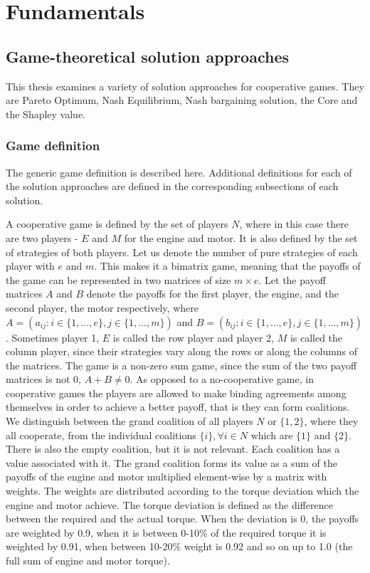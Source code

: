\chapter{Fundamentals}
\label{chp:basics}

\section{Game-theoretical solution approaches}
This thesis examines a variety of solution approaches for cooperative games. They are Pareto Optimum, Nash Equilibrium, Nash bargaining solution, the Core and the Shapley value.

\subsection{Game definition}
The generic game definition is described here. Additional definitions for each of the solution approaches are defined in the corresponding subsections of each solution.

A cooperative game is defined by the set of players $N$, where in this case there are two players - $E$ and $M$ for the engine and motor. It is also defined by the set of strategies of both players. Let us denote the number of pure strategies of each player with  $e$ and $m$. This makes it a bimatrix game, meaning that the payoffs of the game can be represented in two matrices of size $m \times e$. Let the payoff matrices $A$ and $B$ denote the payoffs for the first player, the engine, and the second player, the motor respectively, where $A = (a_{ij}: i \in \{1,...,e\}, j \in \{ 1,...,m\})$ and $B = (b_{ij}: i \in \{1,...,e\}, j \in \{ 1,...,m\})$. Sometimes player 1, $E$ is called  the row player and player 2, $M$ is called the column player, since their strategies vary along the rows or along the columns of the matrices. The game is a non-zero sum game, since the sum of the two payoff matrices is not 0, $A + B \neq 0$.
As opposed to a no-cooperative game, in cooperative games the players are allowed to make binding agreements among themselves in order to achieve a better payoff, that is they can form coalitions. We distinguish between the grand coalition of all players $N$ or $\{1,2\}$, where they all cooperate, from the individual coalitions $\{i\}, \forall i \in N$ which are $\{1\}$ and $\{2\}$. There is also the empty coalition, but it is not relevant. Each coalition has a value associated with it. The grand coalition forms its value as a sum of the payoffs of the engine and motor multiplied element-wise by a matrix with weights. The weights are distributed according to the torque deviation which the engine and motor achieve. The torque deviation is defined as the difference between the required and the actual torque. When the deviation is 0, the payoffs are weighted by 0.9, when it is between 0-10\% of the required torque it is weighted by 0.91, when between 10-20\% weight is 0.92 and so on up to 1.0 (the full sum of engine and motor torque).


